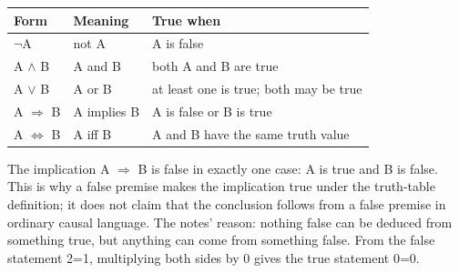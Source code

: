 \documentclass[11pt]{article}
\begin{document}
\begin{keepsection}
\begin{keepsection}
\begin{center}
\begin{minipage}[t]{0.950\linewidth}\centering
{}\par{}\end{minipage}
\end{center}

\begin{center}\small\begin{tabularx}{\linewidth}{>{\raggedright\arraybackslash}X>{\raggedright\arraybackslash}X>{\raggedright\arraybackslash}X}\toprule
\textbf{Form} & \textbf{Meaning} & \textbf{True when} \\ \midrule
\ensuremath{\neg}A & not A & A is false \\
A \ensuremath{\land} B & A and B & both A and B are true \\
A \ensuremath{\lor} B & A or B & at least one is true; both may be true \\
A \ensuremath{\Rightarrow} B & A implies B & A is false or B is true \\
A \ensuremath{\Leftrightarrow} B & A iff B & A and B have the same truth value \\
\bottomrule\end{tabularx}\end{center}

The implication A \ensuremath{\Rightarrow} B is false in exactly one case: A is true and B is false. This is why a false premise makes the implication true under the truth-table definition; it does not claim that the conclusion follows from a false premise in ordinary causal language. The notes’ reason: nothing false can be deduced from something true, but anything can come from something false. From the false statement 2=1, multiplying both sides by 0 gives the true statement 0=0.


\end{keepsection}
\end{keepsection}
\end{document}
